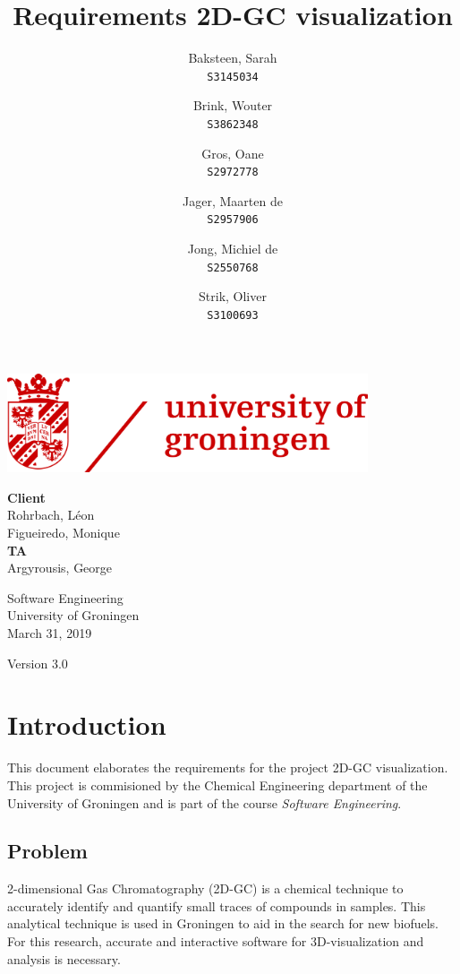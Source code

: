 \documentclass{article}
\title{Requirements 2D-GC visualization}
\author{
  Baksteen, Sarah\\
  \texttt{S3145034}
  \and
  Brink, Wouter\\
  \texttt{S3862348}
  \and
  Gros, Oane\\
  \texttt{S2972778}
  \and
  Jager, Maarten de \\
  \texttt{S2957906}
  \and
  Jong, Michiel de \\
  \texttt{S2550768}
  \and
  Strik, Oliver\\
  \texttt{S3100693}
}
\date{}
\begin{document}
\clearpage
\maketitle
\thispagestyle{empty}
\begin{center}
    \vfill
    \includegraphics[width=0.8\textwidth]{UG_logo.jpg}
    \vfill
    
    \Large
    \textbf{Client} \\
    Rohrbach, Léon \\
    Figueiredo, Monique \\
    
    \vspace{1cm}
    \textbf{TA} \\
    Argyrousis, George
    
    \vspace{2cm}
        Software Engineering \\
        University of Groningen \\
        March 31, 2019  \\
        \empty
        
        \vspace{1cm}
        Version 3.0
\end{center}

\newpage\setcounter{page}{1}
\section{Introduction}
This document elaborates the requirements for the project 2D-GC visualization. This project is commisioned by the Chemical Engineering department of the University of Groningen and is part of the course \textit{Software Engineering}.  

\subsection*{Problem}
2-dimensional Gas Chromatography (2D-GC) is a chemical technique to accurately identify and quantify small traces of compounds in samples. This analytical technique is used in Groningen to aid in the search for new biofuels. For this research, accurate and interactive software for 3D-visualization and analysis is necessary. 
\end{document}
